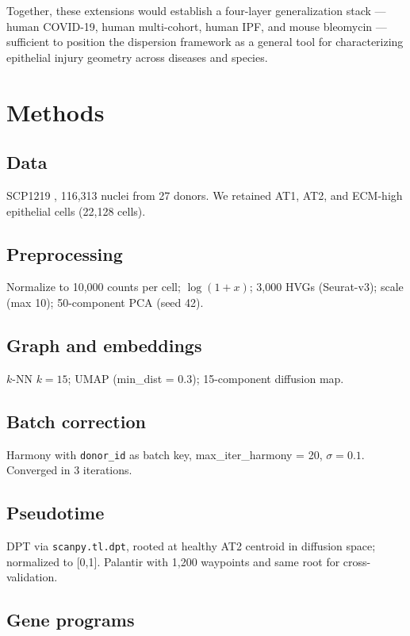 \documentclass[11pt,a4paper]{article}
\begin{document}
Together, these extensions would establish a four-layer generalization stack --- human COVID-19, human multi-cohort, human IPF, and mouse bleomycin --- sufficient to position the dispersion framework as a general tool for characterizing epithelial injury geometry across diseases and species.

\section{Methods}

\subsection{Data}

SCP1219 \citep{Melms2021}, 116,313 nuclei from 27 donors. We retained AT1, AT2, and
ECM-high epithelial cells (22,128 cells).

\subsection{Preprocessing}

Normalize to 10,000 counts per cell; $\log(1+x)$; 3,000 HVGs (Seurat-v3); scale
(max 10); 50-component PCA (seed 42).

\subsection{Graph and embeddings}

$k$-NN $k = 15$; UMAP (min\_dist = 0.3); 15-component diffusion map.

\subsection{Batch correction}

Harmony \citep{Korsunsky2019} with \texttt{donor\_id} as batch key, max\_iter\_harmony = 20,
$\sigma = 0.1$. Converged in 3 iterations.

\subsection{Pseudotime}

DPT \citep{Haghverdi2016} via \texttt{scanpy.tl.dpt}, rooted at healthy AT2 centroid in
diffusion space; normalized to [0,1]. Palantir \citep{Setty2019} with 1,200 waypoints
and same root for cross-validation.

\subsection{Gene programs}
\end{document}
